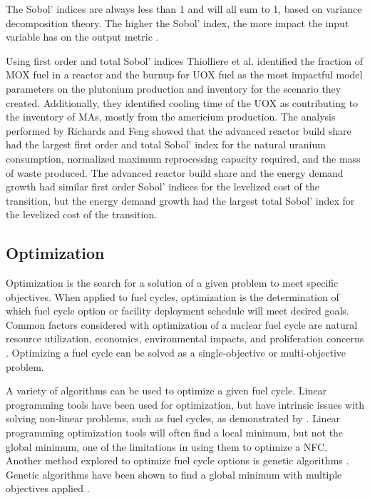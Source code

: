 \noindent The Sobol' indices are always less than 1 and will all sum to 1, 
based
on variance decomposition theory. The higher the Sobol' index, the more 
impact the input variable has on the output metric 
\cite{thiolliere_methodology_2018}.

Using first order and total Sobol' indices Thiolliere et al.
\cite{thiolliere_methodology_2018} identified 
the fraction of \gls{MOX} fuel in a reactor 
and the burnup for \gls{UOX} fuel as the most impactful model parameters on 
the plutonium production and inventory
for the scenario they created. 
Additionally, they identified cooling time of the \gls{UOX} as contributing 
to the inventory of \glspl{MA}, mostly from the 
americium production. The analysis performed by Richards and Feng
\cite{richards_application_2021}
showed that the advanced reactor build share had the largest first 
order and total Sobol' index for the natural uranium consumption, 
normalized 
maximum reprocessing capacity required, and the mass of waste produced. The 
advanced reactor build share and the energy demand growth had similar first 
order Sobol' indices for the levelized cost of the transition, but the 
energy demand growth had the largest total Sobol' index for the levelized 
cost of the transition. 

\subsection{Optimization}
Optimization is the search for a solution of a given problem to 
meet specific objectives. When applied to fuel cycles, optimization 
is the determination of which fuel cycle option or facility 
deployment schedule will meet desired goals. Common factors 
considered with optimization of a nuclear fuel cycle are natural 
resource utilization, economics, environmental impacts, and proliferation 
concerns \cite{passerini_systematic_2014,wigeland_nuclear_2014}. Optimizing 
a fuel cycle can be solved as a single-objective or multi-objective 
problem. 

A variety of algorithms can be used to optimize a given 
fuel cycle. Linear programming tools have been used for 
optimization, but have intrinsic issues with solving non-linear 
problems, such as fuel cycles, as demonstrated by \cite{passerini_systematic_2014}.
Linear programming optimization tools will often find a local minimum, 
but not the global minimum, one of the limitations in using them 
to optimize a \gls{NFC}.
Another method explored to optimize fuel cycle options is genetic 
algorithms \cite{passerini_systematic_2014}. Genetic algorithms 
have been shown to find a global minimum with multiple objectives 
applied \cite{passerini_systematic_2014}. 

